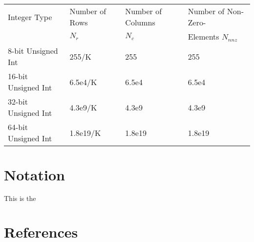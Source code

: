 \documentclass[12pt]{article}
\begin{document}
\begin{table}[]
\begin{tabular}{|l|l|l|l|}
\hline
Integer Type              & Number of Rows                     & Number of Columns & Number of Non-Zero- \\        
                                    & $N_r$  & $N_c$                        & Elements $N_{nnz}$                             \\ \hline
8-bit Unsigned Int     & 255/K                            &                 255            &            255                              \\ \hline
16-bit Unsigned Int   &  6.5e4/K                                                 &          6.5e4     &  6.5e4                        \\ \hline
32-bit Unsigned Int  &  4.3e9/K                                                  &        4.3e9          &  4.3e9                             \\ \hline
64-bit Unsigned Int  &  1.8e19/K                                                  &   1.8e19   & 1.8e19                 \\ \hline
\end{tabular}
\end{table}




\section{Notation}
This is the

\section{References}


\end{document}
